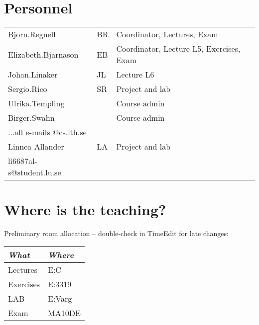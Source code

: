 \section{Personnel}
\begin{flushleft}
	\setlength{\tabcolsep}{0pt}
	\begin{tabular}{p{} p{} p{}}
		Bjorn.Regnell & BR & Coordinator, Lectures, Exam \\
		Elizabeth.Bjarnason & EB & Coordinator, Lecture L5, Exercises, Exam \\
		Johan.Linaker & JL & Lecture L6\\
		Sergio.Rico & SR & Project and lab \\
		Ulrika.Templing & & Course admin \\
		Birger.Swahn & & Course admin \\
		...all e-mails @cs.lth.se\\
		Linnea Allander & LA & Project and lab \\
		li6687al-s@student.lu.se\\
	\end{tabular}
\end{flushleft}

\section{Where is the teaching?}

\noindent Preliminary room allocation -- double-check in TimeEdit for late changes:
\begin{flushleft}
\small
\begin{tabular}{l | l } 
{\it What} & {\it Where} \\
\hline
Lectures & E:C %
\\
Exercises & E:3319 %
\\
LAB& E:Varg %
\\
Exam & MA10DE\\
\end{tabular}
\end{flushleft}

